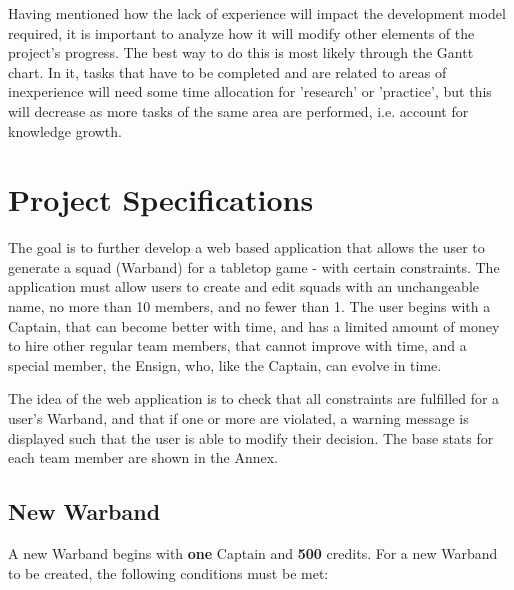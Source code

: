 \documentclass[12pt,a4paper]{article}
\begin{document}
Having mentioned how the lack of experience will impact the development model required, it is important to analyze how it will modify other elements of the project's progress. The best way to do this is most likely through the Gantt chart. In it, tasks that have to be completed and are related to areas of inexperience will need some time allocation for 'research' or 'practice', but this will decrease as more tasks of the same area are performed, i.e. account for knowledge growth. 

\section{Project Specifications}

The goal is to further develop a web based application that allows the user to generate a squad (Warband) for a tabletop game - with certain constraints. The application must allow users to create and edit squads with an unchangeable name, no more than 10 members, and no fewer than 1. The user begins with a Captain, that can become better with time, and has a limited amount of money to hire other regular team members, that cannot improve with time, and a special member, the Ensign, who, like the Captain, can evolve in time.

The idea of the web application is to check that all constraints are fulfilled for a user's Warband, and that if one or more are violated, a warning message is displayed such that the user is able to modify their decision. The base stats for each team member are shown in the Annex.

\subsection{New Warband}

A new Warband begins with \textbf{one} Captain and \textbf{500} credits. For a new Warband to be created, the following conditions must be met:
\end{document}
